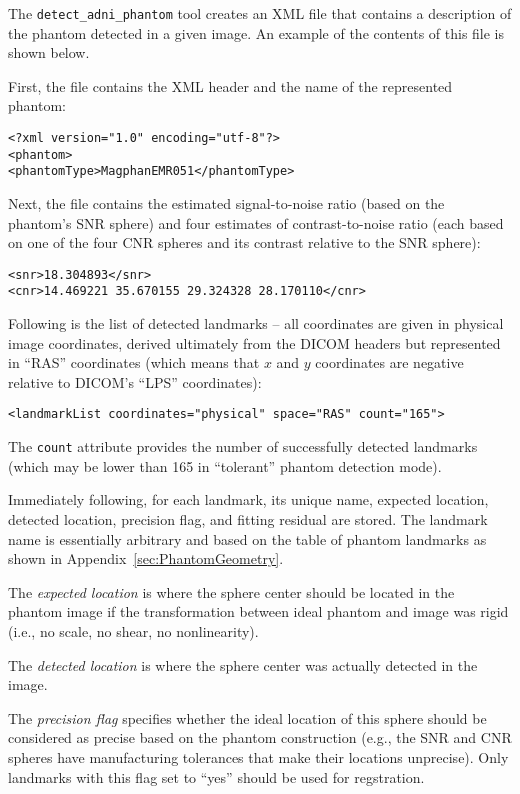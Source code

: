 \documentclass{InsightArticle}
\begin{document}
The \texttt{detect\_adni\_phantom} tool creates an XML file that contains a
description of the phantom detected in a given image. An example of the
contents of this file is shown below.

First, the file contains the XML header and the name of the represented
phantom:
\begin{verbatim}
<?xml version="1.0" encoding="utf-8"?>
<phantom>
<phantomType>MagphanEMR051</phantomType>
\end{verbatim}
Next, the file contains the estimated signal-to-noise ratio (based on the
phantom's SNR sphere) and four estimates of contrast-to-noise ratio (each
based on one of the four CNR spheres and its contrast relative to the SNR
sphere):
\begin{verbatim}
<snr>18.304893</snr>
<cnr>14.469221 35.670155 29.324328 28.170110</cnr>
\end{verbatim}
Following is the list of detected landmarks -- all coordinates are given in
physical image coordinates, derived ultimately from the DICOM headers but
represented in ``RAS'' coordinates (which means that $x$ and $y$ coordinates
are negative relative to DICOM's ``LPS'' coordinates):
\begin{verbatim}
<landmarkList coordinates="physical" space="RAS" count="165">
\end{verbatim} 
The \verb|count| attribute provides the number of successfully detected
landmarks (which may be lower than 165 in ``tolerant'' phantom detection
mode).

Immediately following, for each landmark, its unique name, expected location,
detected location, precision flag, and fitting residual are stored. The
landmark name is essentially arbitrary and based on the table of phantom
landmarks as shown in Appendix~\ref{sec:PhantomGeometry}.

The {\em expected location\/} is where the sphere center should be located in
the phantom image if the transformation between ideal phantom and image was
rigid (i.e., no scale, no shear, no nonlinearity). 

The {\em detected location\/} is where the sphere center was actually detected
in the image.

The {\em precision flag\/} specifies whether the ideal location of this sphere
should be considered as precise based on the phantom construction (e.g., the
SNR and CNR spheres have manufacturing tolerances that make their locations
unprecise). Only landmarks with this flag set to ``yes'' should be used for
regstration.
\end{document}
